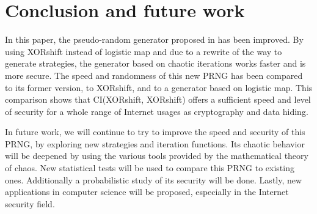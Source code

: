 \documentclass[10pt, a4paper, conference, compsocconf]{IEEEtran}
\begin{document}
\section{Conclusion and future work}
\label{Conclusions and Future Work}

In this paper, the pseudo-random generator proposed in \cite{wang2009} has been improved. By using XORshift instead of logistic map and due to a rewrite of the way to generate strategies, the generator based on chaotic iterations works faster and is more secure. The speed and randomness of this new PRNG has been compared to its former version, to XORshift, and to a generator based on logistic map. This comparison shows that CI(XORshift, XORshift) offers a sufficient speed and level of security for a whole range of Internet usages as cryptography and data hiding. 

In future work, we will continue to try to improve the speed and security of this PRNG, by exploring new strategies and iteration functions. Its chaotic behavior will be deepened by using the various tools provided by the mathematical theory of chaos. New statistical tests will be used to compare this PRNG to existing ones. Additionally a probabilistic study of its security will be done. Lastly, new applications in computer science will be proposed, especially in the Internet security field.


\end{document}
